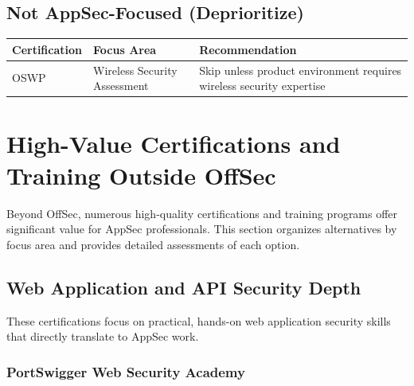 \documentclass[11pt,letterpaper]{article}
\begin{document}
\subsection{Not AppSec-Focused (Deprioritize)}

\begin{table}[H]
\centering
\begin{tabularx}{\textwidth}{l X l}
\toprule
\textbf{Certification} & \textbf{Focus Area} & \textbf{Recommendation} \\
\midrule
OSWP & Wireless Security Assessment & Skip unless product environment requires wireless security expertise \\
\bottomrule
\end{tabularx}
\end{table}

\newpage

\section{High-Value Certifications and Training Outside OffSec}

Beyond OffSec, numerous high-quality certifications and training programs offer significant value for AppSec professionals. This section organizes alternatives by focus area and provides detailed assessments of each option.

\subsection{Web Application and API Security Depth}

These certifications focus on practical, hands-on web application security skills that directly translate to AppSec work.

\subsubsection{PortSwigger Web Security Academy}
\end{document}
